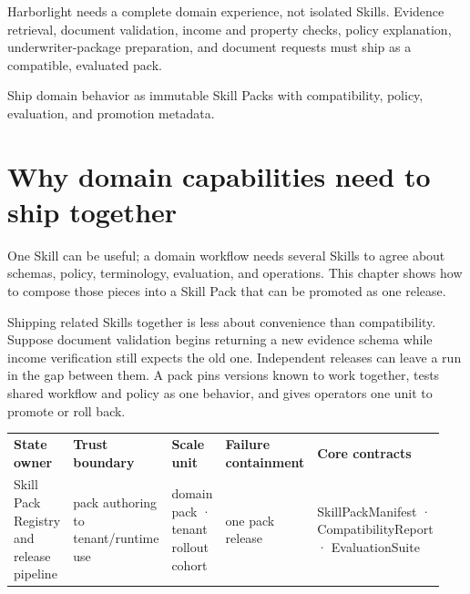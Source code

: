 
\begin{bookcallout}
Harborlight needs a complete domain experience, not isolated Skills. Evidence retrieval, document validation, income and property checks, policy explanation, underwriter-package preparation, and document requests must ship as a compatible, evaluated pack.
\end{bookcallout}

\begin{bookcallout}
Ship domain behavior as immutable Skill Packs with compatibility, policy, evaluation, and promotion metadata.
\end{bookcallout}

\section{Why domain capabilities need to ship together}

One Skill can be useful; a domain workflow needs several Skills to agree about schemas, policy, terminology, evaluation, and operations. This chapter shows how to compose those pieces into a Skill Pack that can be promoted as one release.\par

Shipping related Skills together is less about convenience than compatibility. Suppose document validation begins returning a new evidence schema while income verification still expects the old one. Independent releases can leave a run in the gap between them. A pack pins versions known to work together, tests shared workflow and policy as one behavior, and gives operators one unit to promote or roll back.\par

\BookTableStart
\fontsize{7.2}{9}\selectfont
\begin{tabular}{@{}Y{0.1880\linewidth}Y{0.1880\linewidth}Y{0.1880\linewidth}Y{0.1880\linewidth}Y{0.1880\linewidth}@{}}
\color{white}\bfseries \textbf{State owner} & \color{white}\bfseries \textbf{Trust boundary} & \color{white}\bfseries \textbf{Scale unit} & \color{white}\bfseries \textbf{Failure containment} & \color{white}\bfseries \textbf{Core contracts} \\
Skill Pack Registry and release pipeline & pack authoring to tenant/runtime use & domain pack · tenant rollout cohort & one pack release & SkillPackManifest · CompatibilityReport · EvaluationSuite \\
\end{tabular}
\BookTableEnd

